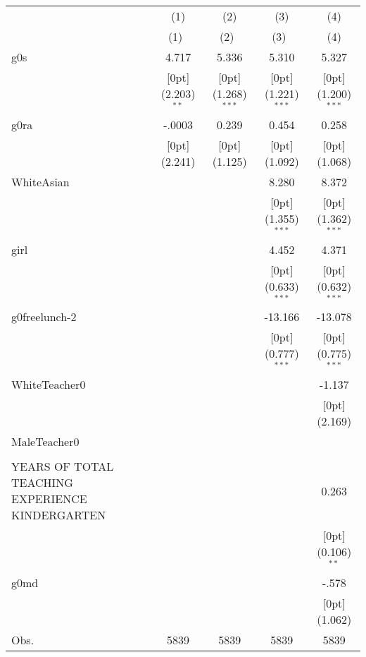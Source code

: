 \begin{tabular*}{\textwidth}{@{\extracolsep{\fill}}lcccc}				
	& \multicolumn{1}{c}{(1)} &	\multicolumn{1}{c}{(2)} &	\multicolumn{1}{c}{(3)} &	\multicolumn{1}{c}{(4)} \\
\cline{2-5}				
	& \multicolumn{1}{c}{(1)\mbox{\ }} &	\multicolumn{1}{c}{(2)\mbox{\ }} &	\multicolumn{1}{c}{(3)\mbox{\ }} &	\multicolumn{1}{c}{(4)} \\
\hline				
g0s &	4.717 &	5.336 &	5.310 &	5.327 \\
&	\raisebox{.7ex}[0pt]{\scriptsize (2.203)$^{**}$} &	\raisebox{.7ex}[0pt]{\scriptsize (1.268)$^{***}$} &	\raisebox{.7ex}[0pt]{\scriptsize (1.221)$^{***}$} &	\raisebox{.7ex}[0pt]{\scriptsize (1.200)$^{***}$} \\
g0ra &	-.0003 &	0.239 &	0.454 &	0.258 \\
&	\raisebox{.7ex}[0pt]{\scriptsize (2.241)} &	\raisebox{.7ex}[0pt]{\scriptsize (1.125)} &	\raisebox{.7ex}[0pt]{\scriptsize (1.092)} &	\raisebox{.7ex}[0pt]{\scriptsize (1.068)} \\
WhiteAsian &	&	&	8.280 &	8.372 \\
&	&	&	\raisebox{.7ex}[0pt]{\scriptsize (1.355)$^{***}$} &	\raisebox{.7ex}[0pt]{\scriptsize (1.362)$^{***}$} \\
girl &	&	&	4.452 &	4.371 \\
&	&	&	\raisebox{.7ex}[0pt]{\scriptsize (0.633)$^{***}$} &	\raisebox{.7ex}[0pt]{\scriptsize (0.632)$^{***}$} \\
g0freelunch-2 &	&	&	-13.166 &	-13.078 \\
&	&	&	\raisebox{.7ex}[0pt]{\scriptsize (0.777)$^{***}$} &	\raisebox{.7ex}[0pt]{\scriptsize (0.775)$^{***}$} \\
WhiteTeacher0 &	&	&	&	-1.137 \\
&	&	&	&	\raisebox{.7ex}[0pt]{\scriptsize (2.169)} \\
MaleTeacher0 &	&	&	&	\\
&	&	&	&	\\
YEARS OF TOTAL TEACHING EXPERIENCE KINDERGARTEN &	&	&	&	0.263 \\
&	&	&	&	\raisebox{.7ex}[0pt]{\scriptsize (0.106)$^{**}$} \\
g0md &	&	&	&	-.578 \\
&	&	&	&	\raisebox{.7ex}[0pt]{\scriptsize (1.062)} \\
Obs. &	5839 &	5839 &	5839 &	5839 \\
\hline\hline				
\end{tabular*}%
